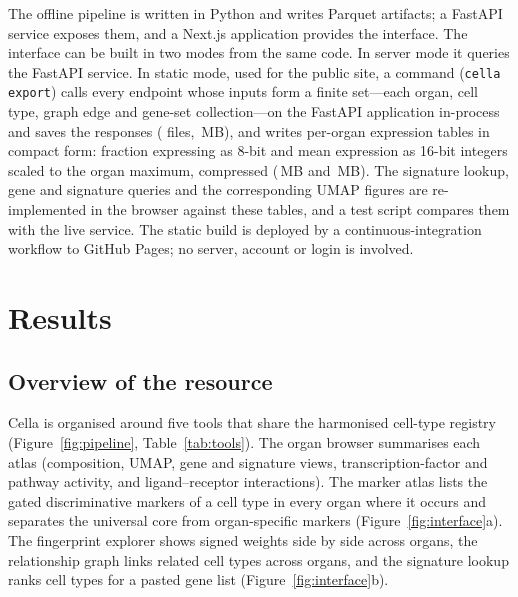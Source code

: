 \documentclass[11pt]{article}
\newcommand{\cella}{Cella}
\begin{document}
The offline pipeline is written in Python and writes Parquet artifacts; a FastAPI service exposes them, and a Next.js application provides the interface. The interface can be built in two modes from the same code. In server mode it queries the FastAPI service. In static mode, used for the public site, a command (\texttt{cella export}) calls every endpoint whose inputs form a finite set---each organ, cell type, graph edge and gene-set collection---on the FastAPI application in-process and saves the responses (\nExportFiles{} files, \exportJsonMB{}\,MB), and writes per-organ expression tables in compact form: fraction expressing as 8-bit and mean expression as 16-bit integers scaled to the organ maximum, compressed (\exportPctMB{}\,MB and \exportMeanMB{}\,MB). The signature lookup, gene and signature queries and the corresponding UMAP figures are re-implemented in the browser against these tables, and a test script compares them with the live service. The static build is deployed by a continuous-integration workflow to GitHub Pages; no server, account or login is involved.

\section{Results}

\subsection{Overview of the resource}

\cella{} is organised around five tools that share the harmonised cell-type registry (Figure~\ref{fig:pipeline}, Table~\ref{tab:tools}). The organ browser summarises each atlas (composition, UMAP, gene and signature views, transcription-factor and pathway activity, and ligand--receptor interactions). The marker atlas lists the gated discriminative markers of a cell type in every organ where it occurs and separates the universal core from organ-specific markers (Figure~\ref{fig:interface}a). The fingerprint explorer shows signed weights side by side across organs, the relationship graph links related cell types across organs, and the signature lookup ranks cell types for a pasted gene list (Figure~\ref{fig:interface}b).
\end{document}
